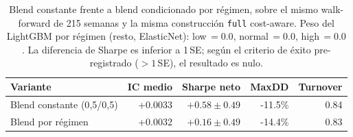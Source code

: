 \begin{table}[htbp]
\centering
\caption{Blend constante frente a blend condicionado por r\'egimen, sobre el mismo walk-forward de 215 semanas y la misma construcci\'on \texttt{full} cost-aware. Peso del LightGBM por r\'egimen (resto, ElasticNet): low\,$=0.0$, normal\,$=0.0$, high\,$=0.0$. La diferencia de Sharpe es inferior a 1\,SE; seg\'un el criterio de \'exito pre-registrado ($>1$\,SE), el resultado es nulo.}
\label{tab:pars-us}
\small
\begin{tabular}{lrrrr}
\toprule
Variante & IC medio & Sharpe neto & MaxDD & Turnover \\
\midrule
Blend constante (0{,}5/0{,}5) & +0.0033 & $+0.58 \pm 0.49$ & -11.5\% & 0.84 \\
Blend por r\'egimen & +0.0032 & $+0.16 \pm 0.49$ & -14.4\% & 0.83 \\
\bottomrule
\end{tabular}
\end{table}
